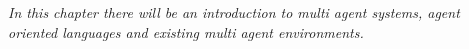 \textit{In this chapter there will be an introduction to multi agent systems, agent oriented languages and existing multi agent environments.}